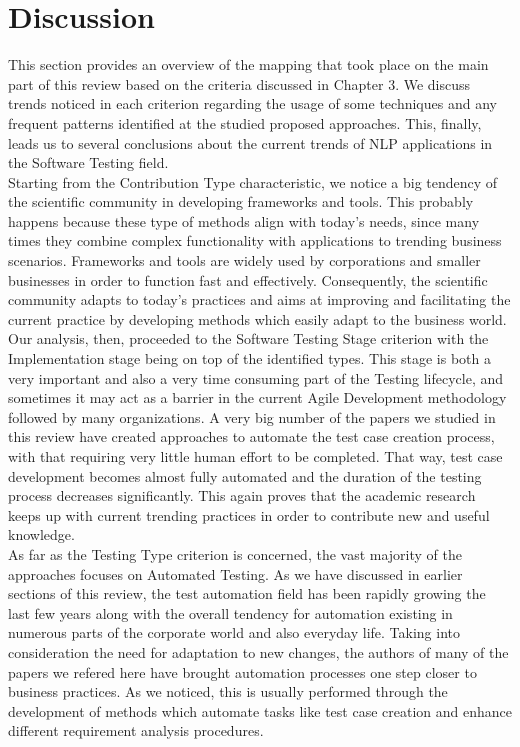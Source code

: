 \section {Discussion}

This section provides an overview of the mapping that took place on the main part of this review based on the criteria discussed in Chapter 3. We discuss trends noticed 
in each criterion regarding the usage of some techniques and any frequent patterns identified at the studied proposed approaches. This, finally, leads us to several conclusions 
about the current trends of NLP applications in the Software Testing field.\\

Starting from the Contribution Type characteristic, we notice a big tendency of the scientific community in developing frameworks and tools. This probably happens because 
these type of methods align with today's needs, since many times they combine complex functionality with applications to trending business scenarios. Frameworks and tools are 
widely used by corporations and smaller businesses in order to function fast and effectively. Consequently, the scientific community adapts to today's practices and aims at 
improving and facilitating the current practice by developing methods which easily adapt to the business world.\\

Our analysis, then, proceeded to the Software Testing Stage criterion with the Implementation stage being on top of the identified types. This stage is both a very important and 
also a very time consuming part of the Testing lifecycle, and sometimes it may act as a barrier in the current Agile Development methodology followed by many organizations. A very 
big number of the papers we studied in this review have created approaches to automate the test case creation process, with that requiring very little human effort to be completed. 
That way, test case development becomes almost fully automated and the duration of the testing process decreases significantly. This again proves that the academic research keeps 
up with current trending practices in order to contribute new and useful knowledge.\\

As far as the Testing Type criterion is concerned, the vast majority of the approaches focuses on Automated Testing. As we have discussed in earlier sections of this review, the test automation 
field has been rapidly growing the last few years along with the overall tendency for automation existing in numerous parts of the corporate world and also everyday life. Taking into consideration 
the need for adaptation to new changes, the authors of many of the papers we refered here have brought automation processes one step closer to business practices. As we noticed, this is usually performed through 
the development of methods which automate tasks like test case creation and enhance different requirement analysis procedures.\\

